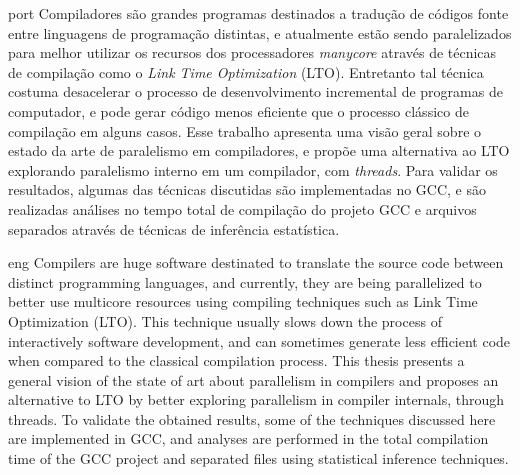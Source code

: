 \begin{resumo}{port}
    Compiladores são grandes programas destinados a tradução de códigos fonte
    entre linguagens de programação distintas, e atualmente estão sendo
    paralelizados para melhor utilizar os recursos dos processadores
    \textit{manycore} através de técnicas de compilação como o \textit{Link
    Time Optimization} (LTO).  Entretanto tal técnica costuma desacelerar o
    processo de desenvolvimento incremental de programas de computador, e pode
    gerar código menos eficiente que o processo clássico de compilação em
    alguns casos. Esse trabalho apresenta uma visão geral sobre o estado da
    arte de paralelismo em compiladores, e propõe uma alternativa ao LTO explorando
    paralelismo interno em um compilador, com \textit{threads}. Para validar
    os resultados, algumas das técnicas discutidas são implementadas no GCC, e
    são realizadas análises no tempo total de compilação do projeto GCC e
    arquivos separados através de técnicas de inferência estatística.
\end{resumo}


\begin{resumo}{eng}
Compilers are huge software destinated to translate the source code between
distinct programming languages, and currently, they are being parallelized to
better use multicore resources using compiling techniques such as Link Time
Optimization (LTO). This technique usually slows down the process of
interactively software development, and can sometimes generate less efficient
code when compared to the classical compilation process. This thesis presents a
general vision of the state of art about parallelism in compilers and proposes
an alternative to LTO by better exploring parallelism in compiler internals,
through threads. To
validate the obtained results, some of the techniques discussed here are
implemented in GCC, and analyses are performed in the total compilation time of
the GCC project and separated files using statistical inference techniques.
\end{resumo}
